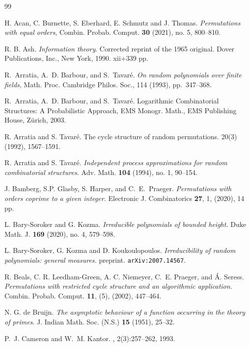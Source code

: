 \begin{thebibliography}{99}

{\sc H. Acan, C. Burnette, S. Eberhard, E. Schmutz and J. Thomas}.
\emph{Permutations with equal orders},
Combin. Probab. Comput. {\bf 30} (2021), no. 5, 800--810. 
%

  {\sc R. B. Ash}. \emph{Information theory}.
  Corrected reprint of the 1965 original.
  Dover Publications, Inc., New York, 1990. xii+339 pp.

{\sc R.~Arratia, A.~D. Barbour, and S.~Tavar\'{e}}. {\em On random polynomials
  over finite fields}, Math. Proc. Cambridge Philos. Soc., 114 (1993),
  pp.~347--368.

{\sc R.~Arratia, A.~D. Barbour, and S.~Tavar\'{e}}.
Logarithmic Combinatorial Structures: A Probabilistic Approach, EMS Monogr. Math., EMS Publishing House, Z\" urich, 2003.

{\sc R. Arratia and S. Tavar\'e}.
\newblock The cycle structure of random permutations.
 20(3) (1992), 1567--1591.
%

{\sc R. Arratia and S. Tavar\'e}.
\emph{Independent process approximations for random combinatorial structures.}
Adv. Math. {\bf 104} (1994), no. 1, 90--154. 
%
%

{\sc J. Bamberg, S.P. Glasby, S. Harper, and C.~E.~Praeger}.
\emph{Permutations with orders coprime to a given integer.}
Electronic J. Combinatorics {\bf 27}, 1, (2020), 14 pp.
 
{\sc L. Bary-Soroker and G. Kozma.}
\emph{Irreducible polynomials of bounded height.}
Duke Math. J. {\bf 169} (2020), no. 4, 579--598. 

{\sc L. Bary-Soroker, G. Kozma and D. Koukoulopoulos}.
{\it Irreducibility of random polynomials: general measures.}
preprint. \texttt{arXiv:2007.14567}.

 
 {\sc R. Beals, C. R. Leedham-Green, A. C. Niemeyer, C.~E.
Praeger, and {\' A}. Seress. }
\emph{Permutations with restricted cycle structure and
an algorithmic application.} 
Combin. Probab. Comput. {\bf 11}, (5), (2002), 447--464.
%

{\sc N. G. de Bruijn}.
\emph{The asymptotic behaviour of a function occurring in the theory of primes}.
J. Indian Math. Soc. (N.S.) {\bf 15} (1951), 25--32. 


{\sc P.~J. Cameron and W.~M. Kantor}.
, 2(3):257--262, 1993.


\end{thebibliography}
